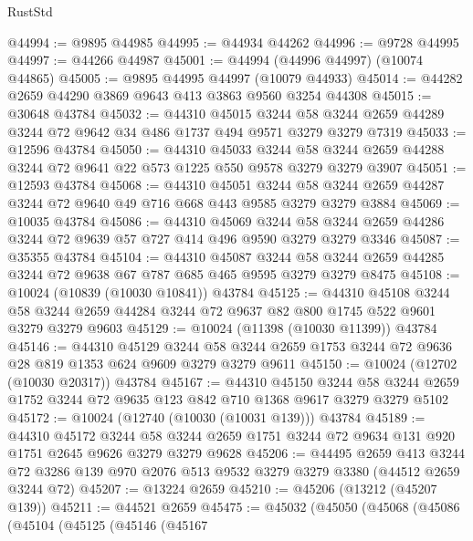 \begin{lexlean}{RustStd}
\begin{coremodule}
@44994 := @9895 @44985
@44995 := @44934 @44262
@44996 := @9728 @44995
@44997 := @44266 @44987
@45001 := @44994 (@44996 @44997) (@10074 @44865)
@45005 := @9895 @44995 @44997 (@10079 @44933)
@45014 := @44282 @2659 @44290 @3869 @9643 @413 @3863 @9560 @3254 @44308
@45015 := @30648 @43784
@45032 := @44310
    @45015
    @3244
    @58
    @3244
    @2659
    @44289
    @3244
    @72
    @9642
    @34
    @486
    @1737
    @494
    @9571
    @3279
    @3279
    @7319
@45033 := @12596 @43784
@45050 := @44310
    @45033
    @3244
    @58
    @3244
    @2659
    @44288
    @3244
    @72
    @9641
    @22
    @573
    @1225
    @550
    @9578
    @3279
    @3279
    @3907
@45051 := @12593 @43784
@45068 := @44310
    @45051
    @3244
    @58
    @3244
    @2659
    @44287
    @3244
    @72
    @9640
    @49
    @716
    @668
    @443
    @9585
    @3279
    @3279
    @3884
@45069 := @10035 @43784
@45086 := @44310
    @45069
    @3244
    @58
    @3244
    @2659
    @44286
    @3244
    @72
    @9639
    @57
    @727
    @414
    @496
    @9590
    @3279
    @3279
    @3346
@45087 := @35355 @43784
@45104 := @44310
    @45087
    @3244
    @58
    @3244
    @2659
    @44285
    @3244
    @72
    @9638
    @67
    @787
    @685
    @465
    @9595
    @3279
    @3279
    @8475
@45108 := @10024 (@10839 (@10030 @10841)) @43784
@45125 := @44310
    @45108
    @3244
    @58
    @3244
    @2659
    @44284
    @3244
    @72
    @9637
    @82
    @800
    @1745
    @522
    @9601
    @3279
    @3279
    @9603
@45129 := @10024 (@11398 (@10030 @11399)) @43784
@45146 := @44310
    @45129
    @3244
    @58
    @3244
    @2659
    @1753
    @3244
    @72
    @9636
    @28
    @819
    @1353
    @624
    @9609
    @3279
    @3279
    @9611
@45150 := @10024 (@12702 (@10030 @20317)) @43784
@45167 := @44310
    @45150
    @3244
    @58
    @3244
    @2659
    @1752
    @3244
    @72
    @9635
    @123
    @842
    @710
    @1368
    @9617
    @3279
    @3279
    @5102
@45172 := @10024 (@12740 (@10030 (@10031 @139))) @43784
@45189 := @44310
    @45172
    @3244
    @58
    @3244
    @2659
    @1751
    @3244
    @72
    @9634
    @131
    @920
    @1751
    @2645
    @9626
    @3279
    @3279
    @9628
@45206 := @44495
    @2659
    @413
    @3244
    @72
    @3286
    @139
    @970
    @2076
    @513
    @9532
    @3279
    @3279
    @3380
    (@44512 @2659 @3244 @72)
@45207 := @13224 @2659
@45210 := @45206 (@13212 (@45207 @139))
@45211 := @44521 @2659
@45475 := @45032
    (@45050
      (@45068
        (@45086
          (@45104
            (@45125
              (@45146
                (@45167

\end{coremodule}
\end{lexlean}
